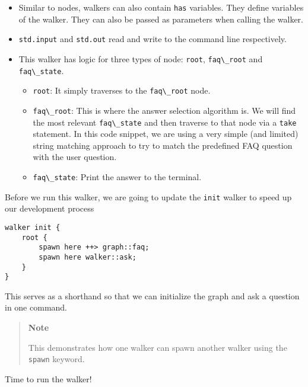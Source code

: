 \begin{itemize}
\tightlist
\item
  Similar to nodes, walkers can also contain
  \passthrough{\lstinline!has!} variables. They define variables of the
  walker. They can also be passed as parameters when calling the walker.
\item
  \passthrough{\lstinline!std.input!} and
  \passthrough{\lstinline!std.out!} read and write to the command line
  respectively.
\item
  This walker has logic for three types of node:
  \passthrough{\lstinline!root!}, \passthrough{\lstinline!faq\_root!}
  and \passthrough{\lstinline!faq\_state!}.

  \begin{itemize}
  \tightlist
  \item
    \passthrough{\lstinline!root!}: It simply traverses to the
    \passthrough{\lstinline!faq\_root!} node.
  \item
    \passthrough{\lstinline!faq\_root!}: This is where the answer
    selection algorithm is. We will find the most relevant
    \passthrough{\lstinline!faq\_state!} and then traverse to that node
    via a \passthrough{\lstinline!take!} statement. In this code
    snippet, we are using a very simple (and limited) string matching
    approach to try to match the predefined FAQ question with the user
    question.
  \item
    \passthrough{\lstinline!faq\_state!}: Print the answer to the
    terminal.
  \end{itemize}
\end{itemize}

Before we run this walker, we are going to update the
\passthrough{\lstinline!init!} walker to speed up our development
process

\begin{lstlisting}
walker init {
    root {
        spawn here ++> graph::faq;
        spawn here walker::ask;
    }
}
\end{lstlisting}

This serves as a shorthand so that we can initialize the graph and ask a
question in one command.

\begin{quote}
\textbf{Note}

This demonstrates how one walker can spawn another walker using the
\passthrough{\lstinline!spawn!} keyword.
\end{quote}

Time to run the walker!

